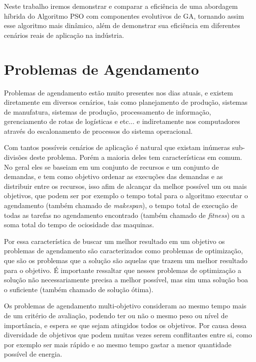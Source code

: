     Neste trabalho iremos demonstrar e comparar a eficiência de uma abordagem híbrida do Algoritmo PSO com componentes evolutivos de GA, tornando assim esse algoritmo mais dinâmico, além de demonstrar sua eficiência em diferentes cenários reais de aplicação na indústria.\newline


\section{Problemas de Agendamento}
        Problemas de agendamento estão muito presentes nos dias atuais, e existem diretamente em diversos cenários, tais como planejamento de produção, sistemas de manufatura, sistemas de produção, processamento de informação, gerenciamento de rotas de logísticas e etc... e indiretamente nos computadores através do escalonamento de processos do sistema operacional.\newline

        Com tantos possíveis cenários de aplicação é natural que existam inúmeras sub-divisões deste problema. Porém a maioria deles tem características em comum. No geral eles se baseiam em um conjunto de recursos e um conjunto de demandas, e tem como objetivo ordenar as execuções das demandas e as distribuir entre os recursos, isso afim de alcançar da melhor possível um ou mais objetivos, que podem ser por exemplo o tempo total para o algoritmo executar o agendamento (também chamado de \textit{makespan}), o tempo total de execução de todas as tarefas no agendamento encontrado (também chamado de \textit{fitness}) ou a soma total do tempo de ociosidade das maquinas.\newline

        Por essa característica de buscar um melhor resultado em um objetivo os problemas de agendamento são caracterizados como problemas de optimização, que são os problemas que a solução são aquelas que trazem um melhor resultado para o objetivo. É importante ressaltar que nesses problemas de optimização a solução não necessariamente precisa a melhor possível, mas sim uma solução boa o suficiente (também chamado de solução ótima).\newline

        Os problemas de agendamento multi-objetivo consideram ao mesmo tempo mais de um critério de avaliação, podendo ter ou não o mesmo peso ou nível de importância, e espera se que sejam atingidos todos os objetivos. Por causa dessa diversidade de objetivos que podem muitas vezes serem conflitantes entre si, como por exemplo ser mais rápido e ao mesmo tempo gastar a menor quantidade possível de energia.\newline

